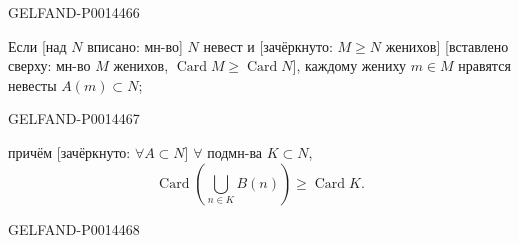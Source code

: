 \begin{GelfandAdjacentEvidence}{GELFAND-P001446}{6}


Если [над \(N\) вписано: мн-во] \(N\) невест и [зачёркнуто: \(M\geq N\) женихов] [вставлено сверху: мн-во \(M\) женихов, \(\operatorname{Card}M\geq\operatorname{Card}N\)], каждому жениху \(m\in M\) нравятся невесты \(A(m)\subset N\);
\end{GelfandAdjacentEvidence}
\begin{GelfandAdjacentEvidence}{GELFAND-P001446}{7}


причём [зачёркнуто: \(\forall A\subset N\)] \(\forall\) подмн-ва \(K\subset N\),
\[
\operatorname{Card}\left(\bigcup_{n\in K}B(n)\right)
\geq \operatorname{Card}K.
\]
\end{GelfandAdjacentEvidence}
\begin{GelfandAdjacentEvidence}{GELFAND-P001446}{8}

\end{GelfandAdjacentEvidence}



